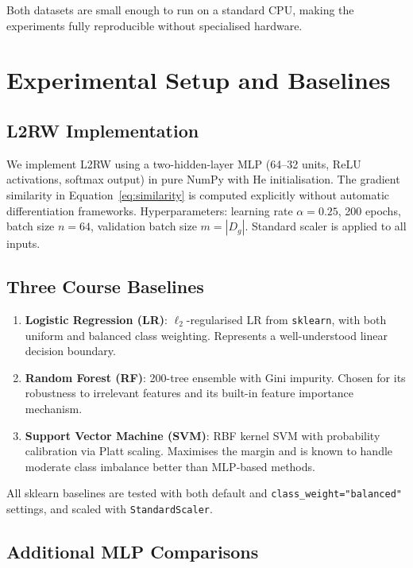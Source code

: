 \documentclass{article}
\begin{document}
Both datasets are small enough to run on a standard CPU, making the experiments
fully reproducible without specialised hardware.

\section{Experimental Setup and Baselines}

\subsection{L2RW Implementation}

We implement L2RW using a two-hidden-layer MLP (64--32 units, ReLU activations,
softmax output) in pure NumPy with He initialisation.
The gradient similarity in Equation~\eqref{eq:similarity} is computed
explicitly without automatic differentiation frameworks.
Hyperparameters: learning rate $\alpha=0.25$, 200 epochs,
batch size $n=64$, validation batch size $m=|D_g|$.
Standard scaler is applied to all inputs.

\subsection{Three Course Baselines}

\begin{enumerate}
  \item \textbf{Logistic Regression (LR)}: $\ell_2$-regularised LR from
    \texttt{sklearn}, with both uniform and balanced class weighting.
    Represents a well-understood linear decision boundary.

  \item \textbf{Random Forest (RF)}: 200-tree ensemble with Gini impurity.
    Chosen for its robustness to irrelevant features and its built-in
    feature importance mechanism.

  \item \textbf{Support Vector Machine (SVM)}: RBF kernel SVM with
    probability calibration via Platt scaling.
    Maximises the margin and is known to handle moderate class imbalance
    better than MLP-based methods.
\end{enumerate}

All sklearn baselines are tested with both default and \texttt{class\_weight="balanced"}
settings, and scaled with \texttt{StandardScaler}.

\subsection{Additional MLP Comparisons}
\end{document}
